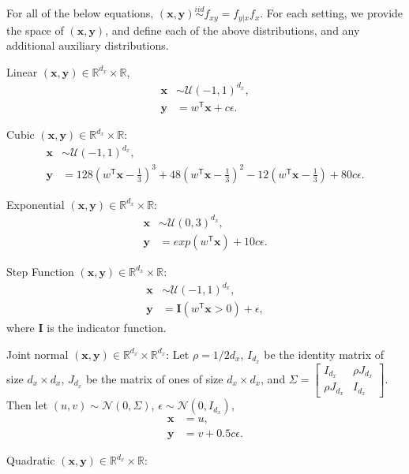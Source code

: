\documentclass[11pt]{article}
\providecommand{\mb}[1]{\boldsymbol{#1}}
\providecommand{\mc}[1]{\mathcal{#1}}
\newcommand{\Real}{\mathbb{R}}
\newcommand{\T}{^{\ensuremath{\mathsf{T}}}}           %
\newcommand{\mbx}{\ensuremath{\mb{x}}}
\newcommand{\mby}{\ensuremath{\mb{y}}}
\begin{document}
For all of the below equations, $(\mbx,\mby) \overset{iid}{\sim} f_{xy} = f_{y|x} f_x$. For each setting, we provide the space of $(\mbx,\mby)$, and define each of the above distributions, and any additional auxiliary distributions.

\setcounter{equation}{0}
\begin{compactenum}
\item Linear $(\mbx,\mby) \in \Real^{d_{x}} \times \Real$,
\begin{align*}
\mbx &\sim \mc{U}(-1,1)^{d_{x}},\\
\mby &=w\T \mbx+c\epsilon.
\end{align*}
\item Cubic $(\mbx,\mby) \in \Real^{d_{x}} \times \Real$:
\begin{align*}
\mbx &\sim \mc{U}(-1,1)^{d_{x}}, \\
\mby &=128(w\T \mbx-\tfrac{1}{3})^3+48(w\T \mbx-\tfrac{1}{3})^2-12(w\T \mbx-\tfrac{1}{3})+80c\epsilon.
\end{align*}
\item Exponential $(\mbx,\mby) \in \Real^{d_{x}} \times \Real$:
\begin{align*}
\mbx &\sim \mc{U}(0,3)^{d_{x}}, \\
\mby &=exp(w\T \mbx)+10c\epsilon.
\end{align*}
\item Step Function $(\mbx,\mby) \in \Real^{d_{x}} \times \Real$:
\begin{align*}
\mbx &\sim \mc{U}(-1,1)^{d_{x}},\\
\mby &=\mb{I}(w\T \mbx>0)+\epsilon,
\end{align*}
where $\mb{I}$ is the indicator function.
\item Joint normal $(\mbx,\mby) \in \Real^{d_{x}} \times \Real^{d_{x}}$: Let $\rho=1/2d_{x}$, $I_{d_{x}}$ be the identity matrix of size $d_{x} \times d_{x}$, $J_{d_{x}}$ be the matrix of ones of size $d_{x} \times d_{x}$, and $\Sigma = \begin{bmatrix} I_{d_{x}}&\rho J_{d_{x}}\\ \rho J_{d_{x}}&I_{d_{x}} \end{bmatrix}$. Then let $(u,v) \sim \mc{N}(0, \Sigma)$, $\epsilon \sim \mc{N}(0, I_{d_{x}})$,
\begin{align*}
\mbx &=u,\\
\mby &=v+0.5c\epsilon.
\end{align*}
\item Quadratic $(\mbx,\mby) \in \Real^{d_{x}} \times \Real$:
\begin{align*}

\end{align*}
\end{compactenum}
\end{document}
